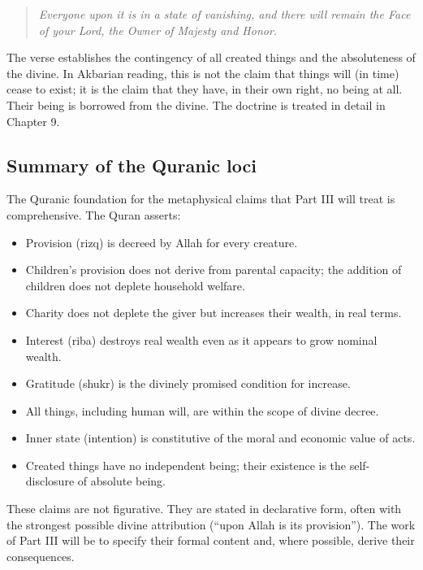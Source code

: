\begin{quote}
\textit{Everyone upon it is in a state of vanishing, and there will
remain the Face of your Lord, the Owner of Majesty and Honor.}
\end{quote}

The verse establishes the contingency of all created things and the
absoluteness of the divine. In Akbarian reading, this is not the
claim that things will (in time) cease to exist; it is the claim
that they have, in their own right, no being at all. Their being is
borrowed from the divine. The doctrine is treated in detail in
Chapter 9.

\subsection{Summary of the Quranic loci}

The Quranic foundation for the metaphysical claims that Part III
will treat is comprehensive. The Quran asserts:

\begin{itemize}[leftmargin=2em]
    \item Provision (rizq) is decreed by Allah for every creature.
    \item Children's provision does not derive from parental
    capacity; the addition of children does not deplete household
    welfare.
    \item Charity does not deplete the giver but increases their
    wealth, in real terms.
    \item Interest (riba) destroys real wealth even as it appears
    to grow nominal wealth.
    \item Gratitude (shukr) is the divinely promised condition for
    increase.
    \item All things, including human will, are within the scope of
    divine decree.
    \item Inner state (intention) is constitutive of the moral and
    economic value of acts.
    \item Created things have no independent being; their existence
    is the self-disclosure of absolute being.
\end{itemize}

These claims are not figurative. They are stated in declarative form,
often with the strongest possible divine attribution (``upon Allah
is its provision''). The work of Part III will be to specify their
formal content and, where possible, derive their consequences.


